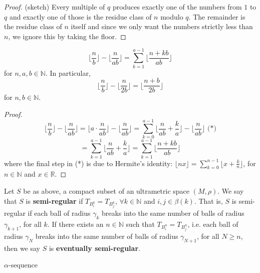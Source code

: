 \begin{proof}
(sketch) Every multiple of $q$ produces exactly one of the numbers from $1$ to $q$ and exactly one of those is the residue class of $n$ modulo $q$. The remainder is the residue class of $n$ itself and since we only want the numbers strictly less than $n$, we ignore this by taking the floor.
\end{proof}


\begin{lemma*}
\[\lfloor\frac{n}{b} \rfloor - \lfloor \frac{n}{ab} \rfloor = \sum_{k=1}^{a-1} \lfloor \frac{n + kb}{ab} \rfloor\] for $n,a,b \in \mathbb{N}$. In particular, 
\[\lfloor\frac{n}{b} \rfloor - \lfloor \frac{n}{2b} \rfloor= \lfloor \frac{n+b}{2b} \rfloor\] for  $n,b \in \mathbb{N}$.
\end{lemma*}

\begin{proof}
\[\lfloor\frac{n}{b} \rfloor - \lfloor \frac{n}{ab} \rfloor = \lfloor a \cdot \frac{n}{ab} \rfloor - \lfloor \frac{n}{ab} \rfloor  = \sum_{k=0}^{a-1} \lfloor \frac{n}{ab} + \frac{k}{a} \rfloor - \lfloor \frac{n}{ab} \rfloor \text{ (*)}\]
\[= \sum_{k=1}^{a-1} \lfloor \frac{n}{ab} + \frac{k}{a} \rfloor = \sum_{k=1}^{a-1} \lfloor \frac{n + kb}{ab} \rfloor \]
where the final step in (*) is due to Hermite's identity: $\lfloor nx \rfloor = \sum_{k=0}^{n-1} \lfloor x + \frac{k}{n} \rfloor$, for $n \in \mathbb{N}$ and $x \in \mathbb{R}$.
\end{proof}                                                                                                              



\begin{definition*}
Let $S$ be as above, a compact subset of an ultrametric space $(M, \rho)$. We say that $S$ is \textbf{semi-regular} if $T_{B^k_i} = T_{B^k_j}$, $\forall k \in \mathbb{N}$ and  $i,j \in \beta(k)$. That is, $S$ is semi-regular if each ball of radius $\gamma_k$ breaks into the same number of balls of radius $\gamma_{k+1}$, for all $k$. If there exists an $n \in \mathbb{N}$ such that $T_{B^n_i} = T_{B^n_j}$, i.e.  each ball of radius $\gamma_N$ breaks into the same number of balls of radius $\gamma_{N+1}$, for all $N \geq n$, then we say $S$ is \textbf{eventually semi-regular}.
\end{definition*}

\begin{definition*}
$\alpha$-sequence
\end{definition*}

